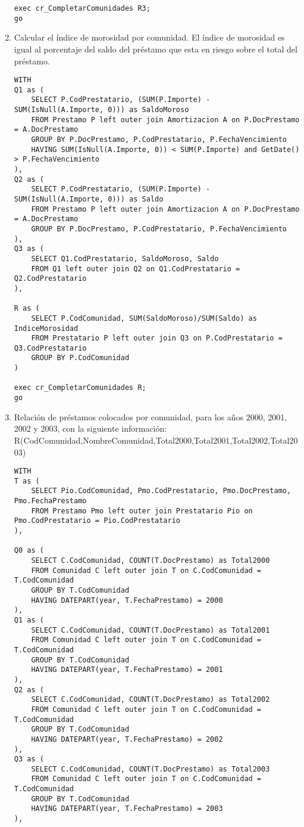 \begin{enumerate}
\begin{verbatim}
exec cr_CompletarComunidades R3;
go
\end{verbatim}

\item Calcular el índice de morosidad por comunidad. El índice de morosidad es
igual al porcentaje del saldo del préstamo que esta en riesgo sobre el total
del préstamo.

\begin{verbatim}
WITH
Q1 as (
    SELECT P.CodPrestatario, (SUM(P.Importe) - SUM(IsNull(A.Importe, 0))) as SaldoMoroso
    FROM Prestamo P left outer join Amortizacion A on P.DocPrestamo = A.DocPrestamo
    GROUP BY P.DocPrestamo, P.CodPrestatario, P.FechaVencimiento
    HAVING SUM(IsNull(A.Importe, 0)) < SUM(P.Importe) and GetDate() > P.FechaVencimiento
),
Q2 as (
    SELECT P.CodPrestatario, (SUM(P.Importe) - SUM(IsNull(A.Importe, 0))) as Saldo
    FROM Prestamo P left outer join Amortizacion A on P.DocPrestamo = A.DocPrestamo
    GROUP BY P.DocPrestamo, P.CodPrestatario, P.FechaVencimiento
),
Q3 as (
    SELECT Q1.CodPrestatario, SaldoMoroso, Saldo
    FROM Q1 left outer join Q2 on Q1.CodPrestatario = Q2.CodPrestatario
),

R as (
    SELECT P.CodComunidad, SUM(SaldoMoroso)/SUM(Saldo) as IndiceMorosidad
    FROM Prestatario P left outer join Q3 on P.CodPrestatario = Q3.CodPrestatario
    GROUP BY P.CodComunidad
)

exec cr_CompletarComunidades R;
go
\end{verbatim}

\item Relación de préstamos colocados por comunidad, para los años 2000, 2001,
2002 y 2003, con la siguiente información:
R(CodComunidad,NombreComunidad,Total2000,Total2001,Total2002,Total2003)

\begin{verbatim}
WITH
T as (
    SELECT Pio.CodComunidad, Pmo.CodPrestatario, Pmo.DocPrestamo, Pmo.FechaPrestamo
    FROM Prestamo Pmo left outer join Prestatario Pio on Pmo.CodPrestatario = Pio.CodPrestatario
),

Q0 as (
    SELECT C.CodComunidad, COUNT(T.DocPrestamo) as Total2000
    FROM Comunidad C left outer join T on C.CodComunidad = T.CodComunidad
    GROUP BY T.CodComunidad
    HAVING DATEPART(year, T.FechaPrestamo) = 2000
),
Q1 as (
    SELECT C.CodComunidad, COUNT(T.DocPrestamo) as Total2001
    FROM Comunidad C left outer join T on C.CodComunidad = T.CodComunidad
    GROUP BY T.CodComunidad
    HAVING DATEPART(year, T.FechaPrestamo) = 2001
),
Q2 as (
    SELECT C.CodComunidad, COUNT(T.DocPrestamo) as Total2002
    FROM Comunidad C left outer join T on C.CodComunidad = T.CodComunidad
    GROUP BY T.CodComunidad
    HAVING DATEPART(year, T.FechaPrestamo) = 2002
),
Q3 as (
    SELECT C.CodComunidad, COUNT(T.DocPrestamo) as Total2003
    FROM Comunidad C left outer join T on C.CodComunidad = T.CodComunidad
    GROUP BY T.CodComunidad
    HAVING DATEPART(year, T.FechaPrestamo) = 2003
),


\end{verbatim}
\end{enumerate}
